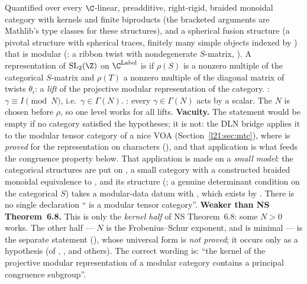 \begin{dictionary}
Quantified over every $\C$-linear, preadditive, right-rigid, braided monoidal category with kernels and finite
biproducts (the bracketed arguments are Mathlib's type classes for these structures), and a spherical fusion structure
 (a pivotal structure with spherical traces, finitely many simple objects indexed by
) that is modular (: a ribbon twist with nondegenerate $S$-matrix,
). A representation  of $\mathrm{SL}_2(\Z)$ on $\C^{\mathrm{Label}}$ is
 if $\rho(S)$ is a nonzero multiple of the categorical $S$-matrix and $\rho(T)$ a nonzero
multiple of the diagonal matrix of twists $\theta_i$: a \emph{lift} of the projective modular representation of the
category. : $\gamma\equiv I\pmod N$, i.e.\ $\gamma\in\Gamma(N)$.
: every $\gamma\in\Gamma(N)$ acts by a scalar. The $N$ is chosen before $\rho$, so
one level works for all lifts. \textbf{Vacuity.} The statement would be empty if no category satisfied the hypotheses;
it is not: the DLN bridge applies it to the modular tensor category of a nice VOA (Section~\ref{l21:sec:mtc}), where
 is \emph{proved} for the representation on characters (),
and that application is what feeds the congruence property below. That application is made on a \emph{small model}:
the categorical structures are put on , a small category with a constructed braided monoidal
equivalence to , and its  structure  (; a
genuine determinant condition on the categorical $S$) takes a modular-data datum  with ,
which exists by . There is no single declaration `` is a modular tensor category''.
\textbf{Weaker than NS Theorem~6.8.} This is only the \emph{kernel half} of NS Theorem~6.8: some $N>0$ works. The other
half --- $N$ is the Frobenius--Schur exponent, and is minimal --- is the separate statement
 (), whose universal form
 is \emph{not proved}; it occurs only as a hypothesis (of
, ,  and others). The
correct wording is: ``the kernel of the projective modular representation of a modular category contains a principal
congruence subgroup''.
\end{dictionary}

